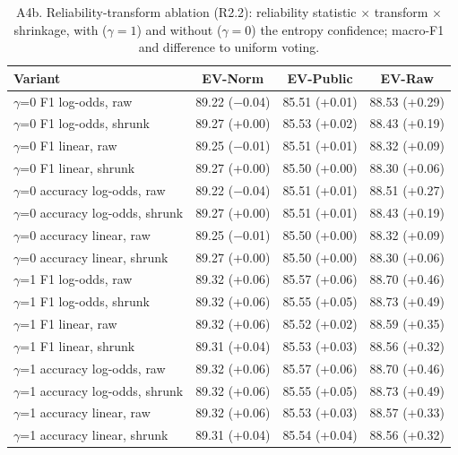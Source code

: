\begin{table}[!htbp]\centering\scriptsize
\caption*{A4b. Reliability-transform ablation (R2.2): reliability statistic $\times$ transform $\times$ shrinkage, with ($\gamma=1$) and without ($\gamma=0$) the entropy confidence; macro-F1 and difference to uniform voting.}
\begin{tabular}{lccc}\toprule
Variant & EV-Norm & EV-Public & EV-Raw \\ \midrule
$\gamma$=0 F1 log-odds, raw & 89.22 ($-$0.04) & 85.51 (+0.01) & 88.53 (+0.29) \\
$\gamma$=0 F1 log-odds, shrunk & 89.27 (+0.00) & 85.53 (+0.02) & 88.43 (+0.19) \\
$\gamma$=0 F1 linear, raw & 89.25 ($-$0.01) & 85.51 (+0.01) & 88.32 (+0.09) \\
$\gamma$=0 F1 linear, shrunk & 89.27 (+0.00) & 85.50 (+0.00) & 88.30 (+0.06) \\
$\gamma$=0 accuracy log-odds, raw & 89.22 ($-$0.04) & 85.51 (+0.01) & 88.51 (+0.27) \\
$\gamma$=0 accuracy log-odds, shrunk & 89.27 (+0.00) & 85.51 (+0.01) & 88.43 (+0.19) \\
$\gamma$=0 accuracy linear, raw & 89.25 ($-$0.01) & 85.50 (+0.00) & 88.32 (+0.09) \\
$\gamma$=0 accuracy linear, shrunk & 89.27 (+0.00) & 85.50 (+0.00) & 88.30 (+0.06) \\
$\gamma$=1 F1 log-odds, raw & 89.32 (+0.06) & 85.57 (+0.06) & 88.70 (+0.46) \\
$\gamma$=1 F1 log-odds, shrunk & 89.32 (+0.06) & 85.55 (+0.05) & 88.73 (+0.49) \\
$\gamma$=1 F1 linear, raw & 89.32 (+0.06) & 85.52 (+0.02) & 88.59 (+0.35) \\
$\gamma$=1 F1 linear, shrunk & 89.31 (+0.04) & 85.53 (+0.03) & 88.56 (+0.32) \\
$\gamma$=1 accuracy log-odds, raw & 89.32 (+0.06) & 85.57 (+0.06) & 88.70 (+0.46) \\
$\gamma$=1 accuracy log-odds, shrunk & 89.32 (+0.06) & 85.55 (+0.05) & 88.73 (+0.49) \\
$\gamma$=1 accuracy linear, raw & 89.32 (+0.06) & 85.53 (+0.03) & 88.57 (+0.33) \\
$\gamma$=1 accuracy linear, shrunk & 89.31 (+0.04) & 85.54 (+0.04) & 88.56 (+0.32) \\
\bottomrule\end{tabular}\end{table}

